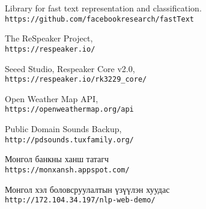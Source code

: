 \begin{thebibliography}{9}
	Library for fast text representation and classification.
	\\\texttt{https://github.com/facebookresearch/fastText}

	The ReSpeaker Project,
	\\\texttt{https://respeaker.io/}

	Seeed Studio, Respeaker Core v2.0,
	\\\texttt{https://respeaker.io/rk3229\_core/}

	Open Weather Map API,
	\\\texttt{https://openweathermap.org/api}

	Public Domain Sounds Backup,
	\\\texttt{http://pdsounds.tuxfamily.org/}

	Монгол банкны ханш татагч
	\\\texttt{https://monxansh.appspot.com/}

	Монгол хэл боловсруулалтын үзүүлэн хуудас
	\\\texttt{http://172.104.34.197/nlp-web-demo/}
\end{thebibliography}